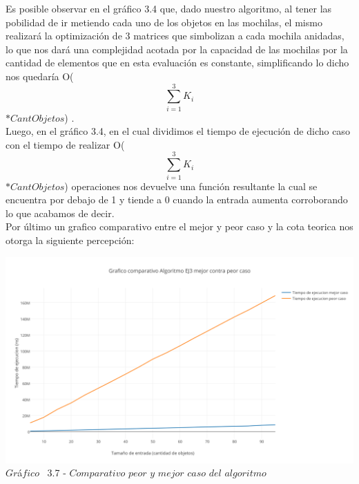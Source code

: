   
Es posible observar en el gr\'afico 3.4 que, dado nuestro algoritmo, al tener las pobilidad de ir metiendo cada uno de los objetos en las mochilas, el mismo realizar\'a la optimizaci\'on de 3 matrices que simbolizan a cada mochila anidadas, lo que nos dar\'a una complejidad acotada por la capacidad de las mochilas por la cantidad de elementos que en esta evaluaci\'on es constante, simplificando lo dicho nos quedar\'ia O(\[
\sum_{i=1}^{3}K_{i} 
\] $\ast CantObjetos$) .\\
Luego, en el gr\'afico 3.4, en el cual dividimos el tiempo de ejecuci\'on de dicho caso con el tiempo de realizar O(\[
\sum_{i=1}^{3}K_{i} 
\] $\ast CantObjetos$) operaciones nos devuelve una funci\'on resultante la cual se encuentra por debajo de 1 y tiende a 0 cuando la entrada aumenta corroborando lo que acabamos de decir.\\

Por \'ultimo un grafico comparativo entre el mejor y peor caso y la cota teorica nos otorga la siguiente percepci\'on:\\ 

\vspace*{0.3cm} \vspace*{0.3cm}
  \begin{center}
 \includegraphics[scale=0.65]{./EJ3/comparativo2.png}
 {$Gr$\'a$fico$ \ 3.7 - $Comparativo$ $peor$ $y$ $mejor$ $caso$ $del$ $algoritmo$}
  \end{center}
  \vspace*{0.3cm}


